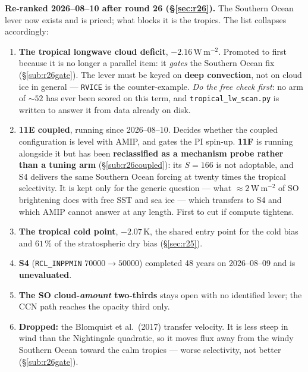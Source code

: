 \documentclass[10pt]{article}
\begin{document}
\textbf{Re-ranked 2026--08--10 after round 26 (\S\ref{sec:r26}).} The Southern Ocean lever
now exists and is priced; what blocks it is the tropics. The list collapses accordingly:
\begin{enumerate}\itemsep2pt
\item \textbf{The tropical longwave cloud deficit}, $-2.16$\,W\,m$^{-2}$. Promoted to first
because it is no longer a parallel item: it \emph{gates} the Southern Ocean fix
(\S\ref{sub:r26gate}). The lever must be keyed on \textbf{deep convection}, not on cloud ice
in general --- \texttt{RVICE} is the counter-example. \emph{Do the free check first}: no arm
of ${\sim}52$ has ever been scored on this term, and \texttt{tropical\_lw\_scan.py} is
written to answer it from data already on disk.
\item \textbf{11E coupled}, running since 2026--08--10. Decides whether the coupled
configuration is level with AMIP, and gates the PI spin-up. \textbf{11F} is running
alongside it but has been \textbf{reclassified as a mechanism probe rather than a tuning
arm} (\S\ref{sub:r26coupled}): its $S=166$ is not adoptable, and S4 delivers the same
Southern Ocean forcing at twenty times the tropical selectivity. It is kept only for the
generic question --- what ${\approx}2$\,W\,m$^{-2}$ of SO brightening does with free SST
and sea ice --- which transfers to S4 and which AMIP cannot answer at any length. First to
cut if compute tightens.
\item \textbf{The tropical cold point}, $-2.07$\,K, the shared entry point for the cold bias
and $61\,\%$ of the stratospheric dry bias (\S\ref{sec:r25}).
\item \textbf{S4} (\texttt{RCL\_INPPMIN} $70000\to50000$) completed 48 years on
2026--08--09 and is \textbf{unevaluated}.
\item \textbf{The SO cloud-\emph{amount} two-thirds} stays open with no identified lever; the
CCN path reaches the opacity third only.
\item \textbf{Dropped:} the Blomquist et al.\ (2017) transfer velocity. It is less steep in
wind than the Nightingale quadratic, so it moves flux away from the windy Southern Ocean
toward the calm tropics --- worse selectivity, not better (\S\ref{sub:r26gate}).
\end{enumerate}
\end{document}
